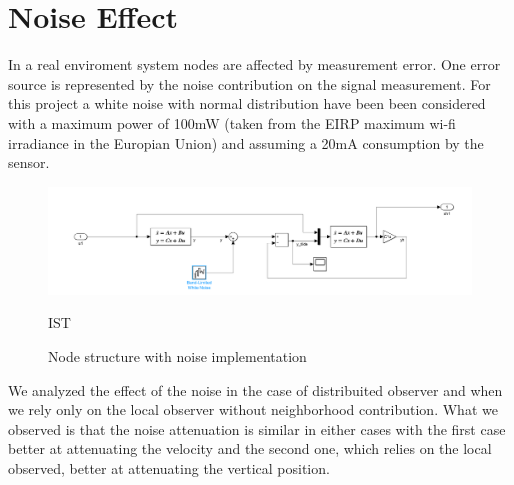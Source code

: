 \section{Noise Effect}
In a real enviroment system nodes are affected by measurement error. One error source is represented by the noise contribution on the signal measurement.
For this project a white noise with normal distribution have been been considered with a maximum power of 100mW (taken from the EIRP maximum wi-fi irradiance 
in the Europian Union) and assuming a 20mA consumption by the sensor. 

\begin{figure}[H]
        \centering
        \includegraphics[width=\textwidth]{img/node_structure_w_noise.PNG}
        \caption{IST}
    \caption{Node structure with noise implementation}
\end{figure}

We analyzed the effect of the noise in the case of distribuited observer and when we rely only on the local observer without neighborhood contribution.
What we observed is that the noise attenuation is similar in either cases with the first case better at attenuating the velocity and the second one, which relies on the 
local observed, better at attenuating the vertical position.

